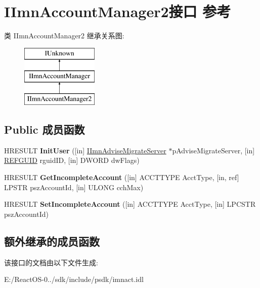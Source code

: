 \hypertarget{interface_i_imn_account_manager2}{}\section{I\+Imn\+Account\+Manager2接口 参考}
\label{interface_i_imn_account_manager2}
类 I\+Imn\+Account\+Manager2 继承关系图\+:\begin{figure}[H]
\begin{center}
\leavevmode
\includegraphics[height=3.000000cm]{interface_i_imn_account_manager2}
\end{center}
\end{figure}
\subsection*{Public 成员函数}
\begin{DoxyCompactItemize}
\item 
\mbox{\label{interface_i_imn_account_manager2_ae4870054b454047bb3501e77ecf8ddcd}} 
H\+R\+E\+S\+U\+LT {\bfseries Init\+User} (\mbox{[}in\mbox{]} \hyperlink{interface_i_imn_advise_migrate_server}{I\+Imn\+Advise\+Migrate\+Server} $\ast$p\+Advise\+Migrate\+Server, \mbox{[}in\mbox{]} \hyperlink{struct___g_u_i_d}{R\+E\+F\+G\+U\+ID} rguid\+ID, \mbox{[}in\mbox{]} D\+W\+O\+RD dw\+Flags)
\item 
\mbox{\label{interface_i_imn_account_manager2_add602e51531b8c2eb15cada7c2e05cfb}} 
H\+R\+E\+S\+U\+LT {\bfseries Get\+Incomplete\+Account} (\mbox{[}in\mbox{]} A\+C\+C\+T\+T\+Y\+PE Acct\+Type, \mbox{[}in, ref\mbox{]} L\+P\+S\+TR psz\+Account\+Id, \mbox{[}in\mbox{]} U\+L\+O\+NG cch\+Max)
\item 
\mbox{\label{interface_i_imn_account_manager2_a912f6e49a54b38c9dde410f02b776057}} 
H\+R\+E\+S\+U\+LT {\bfseries Set\+Incomplete\+Account} (\mbox{[}in\mbox{]} A\+C\+C\+T\+T\+Y\+PE Acct\+Type, \mbox{[}in\mbox{]} L\+P\+C\+S\+TR psz\+Account\+Id)
\end{DoxyCompactItemize}
\subsection*{额外继承的成员函数}


该接口的文档由以下文件生成\+:\begin{DoxyCompactItemize}
\item 
E\+:/\+React\+O\+S-\/0../sdk/include/psdk/imnact.\+idl\end{DoxyCompactItemize}
